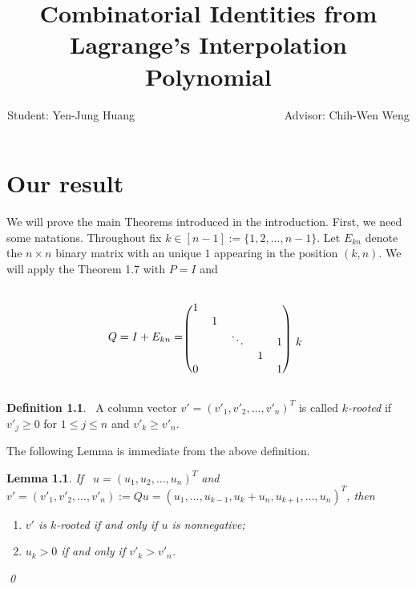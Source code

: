 \documentclass[12pt]{report}%
\title{Combinatorial Identities from Lagrange's Interpolation Polynomial}
\author{Student: Yen-Jung Huang  ~~~~~~~~~~~~~~~~~~~~~~~~~~Advisor: Chih-Wen Weng}
\date{} %
\theoremstyle{plain}
\newtheorem{lem}[thm]{Lemma}
\theoremstyle{definition}
\newtheorem{defn}[thm]{Definition}
\begin{document}
\chapter{Our result}
We will prove the main Theorems introduced in the introduction. First, we need some natations.
 Throughout fix $k \in [n-1] := \{1,2,...,n-1\}$. Let $E_{kn}$ denote the $n\times n$ binary matrix with an unique $1$ appearing in the  position $(k,n)$. We will apply the Theorem 1.7 with $P=I$ and 



\begin{equation}
Q=I+E_{kn}=\begin{blockarray}{cccccc}
 &  &  & &  \\
\begin{block}{(ccccc)c}
	\label{Q1}
  1 &   &   &   &   &  \\
    & 1 &   &   &   &  \\
    &   & \ddots &   & 1 & k \\
    &   &   & 1 &   &  \\
  0 &   &   &   & 1 &  \\
\end{block}
\end{blockarray}
\end{equation}


\begin{defn}\label{v_rooted}
 ~A column vector $v'=(v'_1,v'_2,\ldots,v'_n)^T$ is called {\it $k$-rooted}  if $v'_{j} \geq 0$ for $1 \leq  j \leq n$ and $v'_k\geq v'_n.$
\end{defn}
\bigskip

The following Lemma is immediate from the above definition.
\bigskip

\begin{lem}
If ~$u=(u_1, u_2, \ldots, u_n)^T$ and $v'=(v'_1, v'_2, \ldots, v'_n):=Qu=(u_1,\ldots, u_{k-1},u_k+u_n, u_{k+1}, \ldots,  u_n)^T$, then
\begin{enumerate}
\item[(i)] $v'$ is $k$-rooted  if and only if  $u$ is nonnegative;
\item[(ii)] $u_k>0$ if and only if $v'_k>v'_n$.
\end{enumerate}
\qed
\end{lem}
\end{document}

